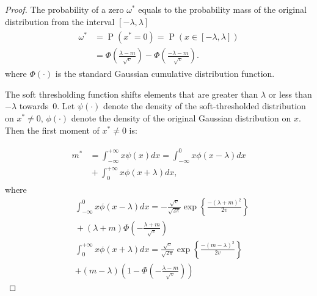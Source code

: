 \documentclass{article}
\begin{document}
\begin{proof}

The probability of a zero $\omega^*$ equals to the probability mass of the original distribution from the interval $[-\lambda, \lambda]$
\begin{align}
\begin{split}
\omega^* &=\operatorname{P}(x^*=0) = \operatorname{P}(x \in [-\lambda, \lambda]) \\
&= \Phi\left(\frac{\lambda-m}{\sqrt{v}}\right) - \Phi\left(\frac{-\lambda-m}{\sqrt{v}}\right).
\end{split}
\end{align}
where $\Phi(\cdot)$ is the standard Gaussian cumulative distribution function.

The soft thresholding function shifts elements that are greater than $\lambda$  or less than $-\lambda$ towards~$0$. Let $\psi(\cdot)$ denote the density of the soft-thresholded distribution on $x^* \neq 0$, $\phi(\cdot)$ denote the density of the original Gaussian distribution on $x$. Then the first moment of $x^* \neq 0$ is:

\begin{align}
\label{eq:thr_first_moment}
\begin{split}
m^* &= \int_{-\infty}^{+\infty}x\psi(x)dx= \int_{-\infty}^{0}x\phi(x-\lambda)dx \\
&{} + \int_{0}^{+\infty}x\phi(x+\lambda)dx,
\end{split}
\end{align}
where
\begin{align}
&\int_{-\infty}^{0}x\phi(x-\lambda)dx = -\frac{\sqrt{v}}{\sqrt{2\pi}} \exp\left\{\frac{-(\lambda+m)^2}{2v}\right\} \nonumber\\
&{} + (\lambda+m)\Phi\left(-\frac{\lambda+m}{\sqrt{v}}\right)\\
&\int_{0}^{+\infty}x\phi(x+\lambda)dx = \frac{\sqrt{v}}{\sqrt{2\pi}} \exp\left\{\frac{-(m - \lambda)^2}{2v}\right\}\nonumber\\
& + (m - \lambda)\left(1 - \Phi\left(-\frac{\lambda-m}{\sqrt{v}}\right)\right)
\end{align}


\end{proof}
\end{document}
